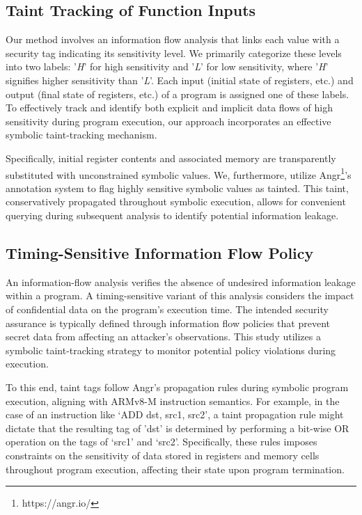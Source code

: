 \subsection{Taint Tracking of Function Inputs}

Our method involves an information flow analysis that links each value with a security tag indicating its sensitivity level. We primarily categorize these levels into two labels: '\textit{H}' for high sensitivity and '\textit{L}' for low sensitivity, where '\textit{H}' signifies higher sensitivity than '\textit{L}'. Each input (initial state of registers, etc.) and output (final state of registers, etc.) of a program is assigned one of these labels. To effectively track and identify both explicit and implicit data flows of high sensitivity during program execution, our approach incorporates an effective symbolic taint-tracking mechanism.

Specifically, initial register contents and associated memory are transparently substituted with unconstrained symbolic values. We, furthermore, utilize Angr\footnote{https://angr.io/}’s annotation system to flag highly sensitive symbolic values as tainted. This taint, conservatively propagated throughout symbolic execution, allows for convenient querying during subsequent analysis to identify potential information leakage. 

\subsection{Timing-Sensitive Information Flow Policy}

An information-flow analysis verifies the absence of undesired information leakage within a program. A timing-sensitive variant of this analysis considers the impact of confidential data on the program's execution time. The intended security assurance is typically defined through information flow policies that prevent secret data from affecting an attacker's observations. This study utilizes a symbolic taint-tracking strategy to monitor potential policy violations during execution.

To this end, taint tags follow Angr's propagation rules during symbolic program execution, aligning with ARMv8-M instruction semantics. For example, in the case of an instruction like ‘ADD dst, src1, src2’, a taint propagation rule might dictate that the resulting tag of 'dst' is determined by performing a bit-wise OR operation on the tags of ‘src1’ and ‘src2’. Specifically, these rules imposes constraints on the sensitivity of data stored in registers and memory cells throughout program execution, affecting their state upon program termination. 

